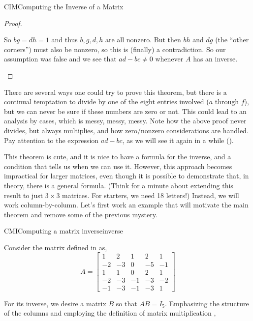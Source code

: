 \begin{subsect}{CIM}{Computing the Inverse of a Matrix}
\begin{proof}
%
\begin{para}So $bg=dh=1$ and thus $b,g,d,h$ are all nonzero.  But then $bh$ and $dg$ (the ``other corners'') must also be nonzero, so this is (finally) a contradiction.   So our assumption was false and we see that $ad-bc\neq 0$ whenever $A$ has an inverse.\end{para}
%
\end{proof}
%
\begin{para}There are several ways one could try to prove this theorem, but there is a continual temptation to divide by one of the eight entries involved ($a$ through $f$), but we can never be sure if these numbers are zero or not.  This could lead to an analysis by cases, which is messy, messy, messy.  Note how the above proof never divides, but always multiplies, and how zero/nonzero considerations are handled.  Pay attention to the expression $ad-bc$, as we will see it again in a while ().\end{para}
%
\begin{para}This theorem is cute, and it is nice to have a formula for the inverse, and a condition that tells us when we can use it.  However, this approach becomes impractical for larger matrices, even though it is possible to demonstrate that, in theory, there is a general formula.  (Think for a minute about extending this result to just $3\times 3$ matrices.  For starters, we need 18 letters!)  Instead, we will work column-by-column.  Let's first work an example that will motivate the main theorem and remove some of the previous mystery.\end{para}
%
\begin{example}{CMI}{Computing a matrix inverse}{inverse}
\begin{para}Consider the matrix defined in  as,
%
\begin{equation*}
A=
\begin{bmatrix}
 1 & 2 & 1 & 2 & 1 \\
 -2 & -3 & 0 & -5 & -1 \\
 1 & 1 & 0 & 2 & 1 \\
 -2 & -3 & -1 & -3 & -2 \\
 -1 & -3 & -1 & -3 & 1
\end{bmatrix}
\end{equation*}
\end{para}
%
\begin{para}For its inverse, we desire a matrix $B$ so that $AB=I_5$.  Emphasizing the structure of the columns and employing the definition of matrix multiplication ,

\end{para}
\end{example}
\end{subsect}

